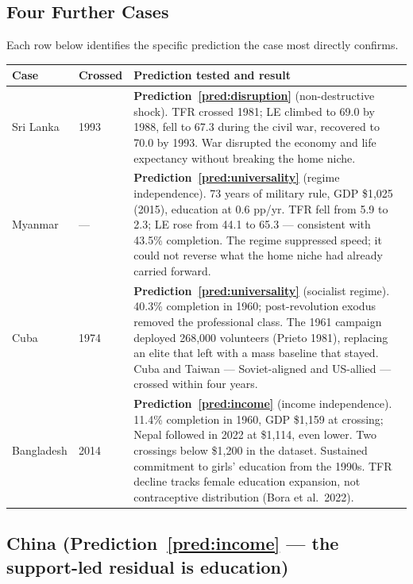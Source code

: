 \documentclass[12pt,letterpaper]{article}
\begin{document}
\subsection{Four Further Cases}\label{four-further-cases}

Each row below identifies the specific prediction the case most
directly confirms.

\begin{longtable}[]{@{}llp{}@{}}
\toprule
Case & Crossed & Prediction tested and result \\
\midrule
\endhead
Sri Lanka & 1993 & \textbf{Prediction~\ref{pred:disruption}} (non-destructive shock). TFR crossed 1981; LE climbed to 69.0 by 1988, fell to 67.3 during the civil war, recovered to 70.0 by 1993. War disrupted the economy and life expectancy without breaking the home niche. \\
Myanmar & --- & \textbf{Prediction~\ref{pred:universality}} (regime independence). 73 years of military rule, GDP \$1,025 (2015), education at 0.6 pp/yr. TFR fell from 5.9 to 2.3; LE rose from 44.1 to 65.3 --- consistent with 43.5\% completion. The regime suppressed speed; it could not reverse what the home niche had already carried forward. \\
Cuba & 1974 & \textbf{Prediction~\ref{pred:universality}} (socialist regime). 40.3\% completion in 1960; post-revolution exodus removed the professional class. The 1961 campaign deployed 268,000 volunteers (Prieto 1981), replacing an elite that left with a mass baseline that stayed. Cuba and Taiwan --- Soviet-aligned and US-allied --- crossed within four years. \\
Bangladesh & 2014 & \textbf{Prediction~\ref{pred:income}} (income independence). 11.4\% completion in 1960, GDP \$1,159 at crossing; Nepal followed in 2022 at \$1,114, even lower. Two crossings below \$1,200 in the dataset. Sustained commitment to girls' education from the 1990s. TFR decline tracks female education expansion, not contraceptive distribution (Bora et al.~2022). \\
\bottomrule
\end{longtable}\addtocounter{table}{-1}%

\subsection{China (Prediction~\ref{pred:income} --- the support-led residual is education)}\label{china}
\end{document}
